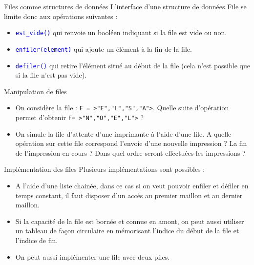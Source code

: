 \documentclass[10pt]{beamer}
\begin{document}
\begin{frame}{\Ctitle}{\stitle}
	\begin{alertblock}{Files comme structures de données}
		L'interface d'une structure de données File se limite donc aux opérations suivantes :
		\begin{itemize}
			\item<2-> \textcolor{blue}{\tt est\_vide()} qui renvoie un booléen indiquant si la file est vide ou non.
			\item<3-> \textcolor{blue}{\tt enfiler(element)} qui ajoute un élément à la fin de la file.
			\item<4-> \textcolor{blue}{\tt defiler()} qui retire l'élément situé au début de la file (cela n'est possible que si la file n'est pas vide).
		\end{itemize}
	\end{alertblock}
\end{frame}

\begin{frame}{\Ctitle}{\stitle}
	\begin{exampleblock}{Manipulation de files}
		\begin{itemize}
			\item<2-> On considère la file : {\tt F = >"E","L","S","A">}. Quelle suite d'opération permet d'obtenir {\tt F= >"N","O","E","L">} ?
			\item<3-> On simule la file d'attente d'une imprimante à l'aide d'une file. A quelle opération sur cette file correspond l'envoie d'une nouvelle impression ? La fin de l'impression en cours ? Dans quel ordre seront effectuées les impressions ?
		\end{itemize}
	\end{exampleblock}
\end{frame}


\begin{frame}[fragile]{\Ctitle}{\stitle}
	\begin{block}{Implémentation des files}
		Plusieurs implémentations sont possibles :
		\begin{itemize}
			\item<1-> A l'aide d'une liste chainée, dans ce cas si on veut pouvoir enfiler et défiler en temps constant, il faut disposer d'un accès au premier maillon et au dernier maillon. 
			\item<2-> Si la capacité de la file est bornée et connue en amont, on peut aussi utiliser un tableau de façon circulaire en mémorisant l'indice du début de la file et l'indice de fin.
			\item<3-> On peut aussi implémenter une file avec deux piles. 
		\end{itemize}
	\end{block}
\end{frame}
\end{document}
